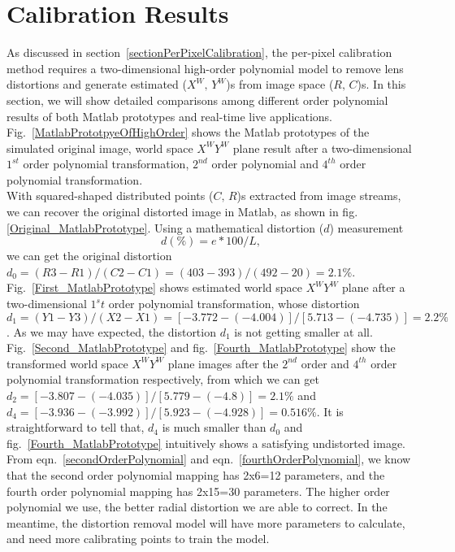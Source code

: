 \section{Calibration Results}
\label{sectionPrototypeTwoDtransformation} 
As discussed in section~\ref{sectionPerPixelCalibration}, the per-pixel calibration method requires a two-dimensional high-order polynomial model to remove lens distortions and generate estimated (\(X^W,\, Y^W\))s from image space (\(R, \, C\))s. In this section, we will show detailed comparisons among different order polynomial results of both Matlab prototypes and real-time live applications. Fig.~\ref{MatlabPrototpyeOfHighOrder} shows the Matlab prototypes of the simulated original image, world space \(X^WY^W\) plane result after a two-dimensional \(1^{st}\) order polynomial transformation, \(2^{nd}\) order polynomial and \(4^{th}\) order polynomial transformation. %
%
\\\indent
With squared-shaped distributed points (\(C,\, R\))s extracted from image streams, we can recover the original distorted image in Matlab, as shown in fig.\ref{Original_MatlabPrototype}. Using a mathematical distortion (\(d\)) measurement \cite{distortionMeasurement_2012}
%
\begin{equation}
d (\%)=  e*100/L ,
\label{mathematicalDistortion}
\end{equation}%
%
\noindent
we can get the original distortion \(d_0 = (R3 - R1) / (C2 -C1) = (403 - 393) / (492 - 20) = 2.1\%\). Fig.~\ref{First_MatlabPrototype} shows estimated world space \(X^WY^W\) plane after a two-dimensional \(1^st\) order polynomial transformation, whose distortion \(d_1 = (Y1 - Y3) / (X2 -X1) = [-3.772 - (-4.004)] / [5.713 - (-4.735)] = 2.2\%\). As we may have expected, the distortion \(d_1\) is not getting smaller at all. Fig.~\ref{Second_MatlabPrototype} and fig.~\ref{Fourth_MatlabPrototype} show the transformed world space \(X^WY^W\) plane images after the \(2^{nd}\) order and \(4^{th}\) order polynomial transformation respectively, from which we can get \(d_2 = [-3.807 - (-4.035)] / [5.779 - (-4.8)] = 2.1\%\) and \(d_4 = [-3.936 - (-3.992)] / [5.923 - (-4.928)] = 0.516\%\). It is straightforward to tell that, \(d_4\) is much smaller than \(d_0\) and fig.~\ref{Fourth_MatlabPrototype} intuitively shows a satisfying undistorted image. From eqn.~\ref{secondOrderPolynomial} and eqn.~\ref{fourthOrderPolynomial}, we know that the second order polynomial mapping has 2x6=12 parameters, and the fourth order polynomial mapping has 2x15=30 parameters. The higher order polynomial we use, the better radial distortion we are able to correct. In the meantime, the distortion removal model will have more parameters to calculate, and need more calibrating points to train the model.%
